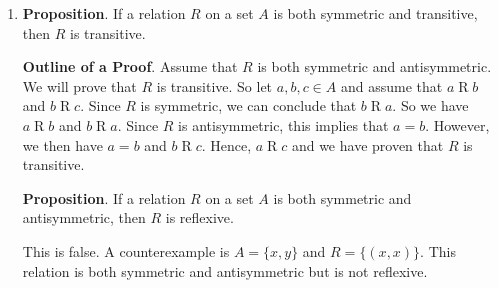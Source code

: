 \documentclass[11pt]{article}
\begin{document}
\begin{enumerate}
\item \textbf{Proposition}.  If a relation $R$ on a set $A$ is both symmetric and transitive, then $R$ is transitive.

\textbf{Outline of a Proof}.  Assume that $R$ is both symmetric and antisymmetric.  We will prove that $R$ is transitive.  So let $a, b, c \in A$ and assume that $a \mathrel{R} b$ and 
$b \mathrel{R} c$. Since $R$ is symmetric, we can conclude that $b \mathrel{R} a$.  So we have 
$a \mathrel{R} b$ and $b \mathrel{R} a$.  Since $R$ is antisymmetric, this implies that 
$a = b$.  However, we then have $a = b$ and $b \mathrel{R} c$.  Hence, $a \mathrel{R} c$ and we have proven that $R$ is transitive.

\textbf{Proposition}.  If a relation $R$ on a set $A$ is both symmetric and antisymmetric, then $R$ is reflexive.

This is false.  A counterexample is $A = \{ x, y \}$ and $R = \{ (x, x) \}$.  This relation is both symmetric and antisymmetric but is not reflexive.

\end{enumerate}
\end{document}
